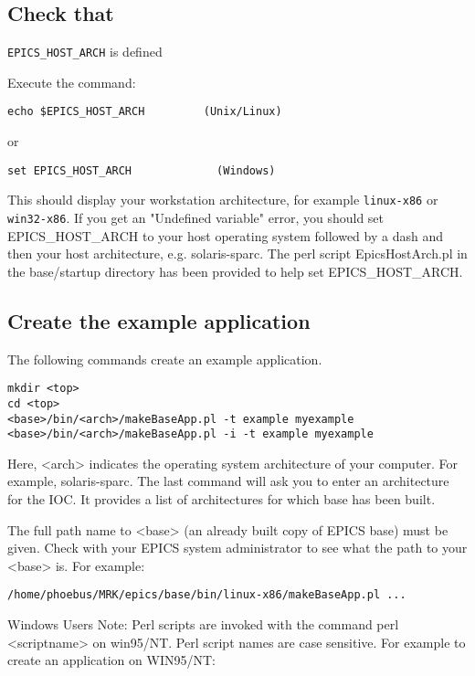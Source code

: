 \subsection{Check that }\verb|EPICS_HOST_ARCH| is defined

Execute the command:

\begin{verbatim}echo $EPICS_HOST_ARCH         (Unix/Linux)
\end{verbatim}or

\begin{verbatim}set EPICS_HOST_ARCH             (Windows)
\end{verbatim}This should display your workstation architecture, for example \verb|linux-x86| or \verb|win32-x86|. If you get an "Undefined 
variable" error, you should set EPICS\_HOST\_ARCH to your host operating system followed by a dash and then your host 
architecture, e.g.  solaris-sparc. The perl script EpicsHostArch.pl in the base/startup directory has been provided to help 
set EPICS\_HOST\_ARCH.

\subsection{Create the example application}

The following commands create an example application.

\begin{verbatim}mkdir <top>
cd <top>
<base>/bin/<arch>/makeBaseApp.pl -t example myexample
<base>/bin/<arch>/makeBaseApp.pl -i -t example myexample
\end{verbatim}Here, \textless{}arch\textgreater{} indicates the operating system architecture of your computer.  For example, solaris-sparc. The last command 
will ask you to enter an architecture for the IOC. It provides a list of architectures for which base has been built.

The full path name to \textless{}base\textgreater{} (an already built copy of EPICS base) must be given. Check with your EPICS system 
administrator to see what the path to your \textless{}base\textgreater{} is. For example:

\begin{verbatim}/home/phoebus/MRK/epics/base/bin/linux-x86/makeBaseApp.pl ...
\end{verbatim}Windows Users Note: Perl scripts are invoked with the command perl \textless{}scriptname\textgreater{} on win95/NT. Perl script names are 
case sensitive. For example to create an application on WIN95/NT:


